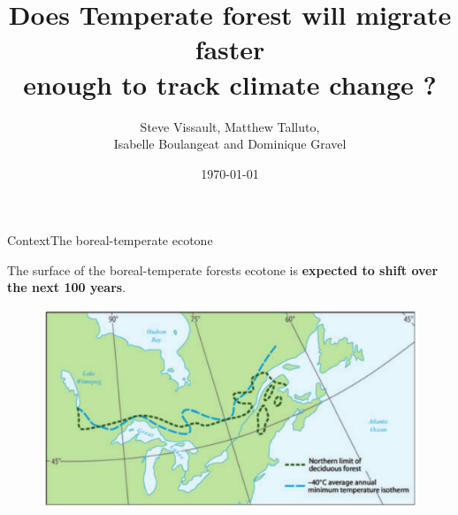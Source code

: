 \documentclass[10pt,aspectratio=149]{beamer}
\author{Steve Vissault, Matthew Talluto, \\
Isabelle Boulangeat and Dominique Gravel}
\title{Does Temperate forest will migrate faster \\ enough to track climate change ?}
\date{\today}
\institute{Université du Québec à Rimouski}
\begin{document}
\begin{frame}[plain]
   \titlepage
\end{frame}



\begin{frame}{Context}{The boreal-temperate ecotone}

The surface of the boreal-temperate forests ecotone is \textbf{expected to shift over the next 100 years}.

\begin{figure}
	\includegraphics[width=.70\paperwidth]{Figs/climecotone.png}
\end{figure}

\end{frame}

\end{document}
